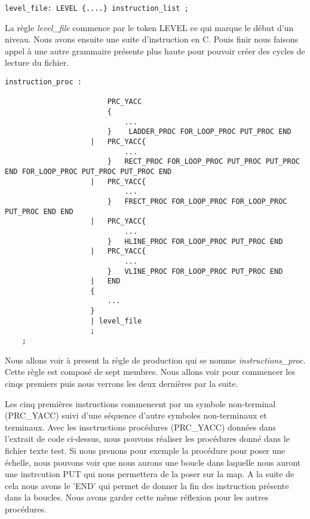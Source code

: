 \lstset{style=mystyle}
\begin{lstlisting}[caption=Lecture d'un niveau]
    level_file: LEVEL {....} instruction_list ;
\end{lstlisting}

La règle \textit{level\_file} commence par le token LEVEL ce qui marque le début d'un niveau. Nous avons ensuite une suite d'instruction en C. Pouis finir nous faisons appel à une autre grammaire présente  plus haute pour pouvoir créer des cycles de lecture du fichier.

\lstset{style=mystyle}
\begin{lstlisting}[caption=Grammaire pour l'instruction d'une procédure]
    instruction_proc : 
                    
                        PRC_YACC
                        {
                            ...
                        }    LADDER_PROC FOR_LOOP_PROC PUT_PROC END
                    |   PRC_YACC{
                            ...
                        }   RECT_PROC FOR_LOOP_PROC PUT_PROC PUT_PROC END FOR_LOOP_PROC PUT_PROC PUT_PROC END
                    |   PRC_YACC{
                            ...
                        }   FRECT_PROC FOR_LOOP_PROC FOR_LOOP_PROC PUT_PROC END END
                    |   PRC_YACC{
                            ...
                        }   HLINE_PROC FOR_LOOP_PROC PUT_PROC END   
                    |   PRC_YACC{
                            ...
                        }   VLINE_PROC FOR_LOOP_PROC PUT_PROC END
                    |   END
                    {
                        ...
                    }
                    | level_file
                    ;
    ;
\end{lstlisting}

Nous allons voir à present la règle de production qui se nomme \textit{instructions\_proc}.
Cette règle est composé de sept membres. Nous allons voir pour commencer les cinqs premiers puis nous verrons les deux dernières par la suite.

Les cinq premières instructions commencent par un symbole non-terminal (PRC\_YACC) suivi d'une séquence d'autre symboles non-terminaux et terminaux.
Avec les insctructions procédures (PRC\_YACC) données dans l'extrait de code ci-dessus, nous pouvons réaliser les procédures donné dans le fichier texte test.
Si nous prenons pour exemple la procédure pour poser une échelle, nous pouvons voir que nous aurons une boucle dans laquelle nous auront une instrcution PUT qui nous permettera de la poser sur la map. A la suite de cela nous avons le 'END' qui permet de donner la fin des instruction présente dans la boucles.
Nous avons garder cette même réflexion pour les autres procédures.

